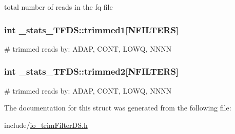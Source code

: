 total number of reads in the fq file \hypertarget{struct__stats__TFDS_a1b6637f8d945758c920ea95107a10379}{
\subsubsection[{trimmed1}]{\setlength{\rightskip}{0pt plus 5cm}int \+\_\+stats\+\_\+\+T\+F\+D\+S\+::trimmed1\mbox{[}{\bf N\+F\+I\+L\+T\+E\+R\+S}\mbox{]}}}\label{struct__stats__TFDS_a1b6637f8d945758c920ea95107a10379}
\# trimmed reads by\+: A\+D\+A\+P, C\+O\+N\+T, L\+O\+W\+Q, N\+N\+N\+N \hypertarget{struct__stats__TFDS_ac83a1c0eb87d51443fe75ce235047af8}{
\subsubsection[{trimmed2}]{\setlength{\rightskip}{0pt plus 5cm}int \+\_\+stats\+\_\+\+T\+F\+D\+S\+::trimmed2\mbox{[}{\bf N\+F\+I\+L\+T\+E\+R\+S}\mbox{]}}}\label{struct__stats__TFDS_ac83a1c0eb87d51443fe75ce235047af8}
\# trimmed reads by\+: A\+D\+A\+P, C\+O\+N\+T, L\+O\+W\+Q, N\+N\+N\+N 

The documentation for this struct was generated from the following file\+:\begin{DoxyCompactItemize}
\item 
include/\hyperlink{io__trimFilterDS_8h}{io\+\_\+trim\+Filter\+D\+S.\+h}\end{DoxyCompactItemize}
